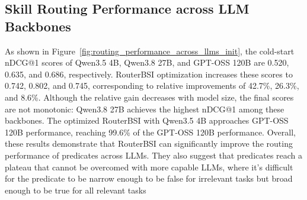 \subsection{Skill Routing Performance across LLM Backbones}

As shown in Figure~\ref{fig:routing_performance_across_llms_init}, the cold-start nDCG@1 scores of Qwen3.5 4B, Qwen3.8 27B, and GPT-OSS 120B are 0.520, 0.635, and 0.686, respectively. RouterBSI optimization increases these scores to 0.742, 0.802, and 0.745, corresponding to relative improvements of 42.7\%, 26.3\%, and 8.6\%. Although the relative gain decreases with model size, the final scores are not monotonic: Qwen3.8 27B achieves the highest nDCG@1 among these backbones. The optimized RouterBSI with Qwen3.5 4B approaches GPT-OSS 120B performance, reaching 99.6\% of the GPT-OSS 120B performance. Overall, these results demonstrate that RouterBSI can significantly improve the routing performance of predicates across LLMs. They also suggest that predicates reach a plateau that cannot be overcomed with more capable LLMs, where it's difficult for the predicate to be narrow enough to be false for irrelevant tasks but broad enough to be true for all relevant tasks



\afterpage{%
\begingroup
\let\backbonepagefigure\figure
\renewcommand{\figure}[1][]{\backbonepagefigure[!ht]}

\endgroup
}

